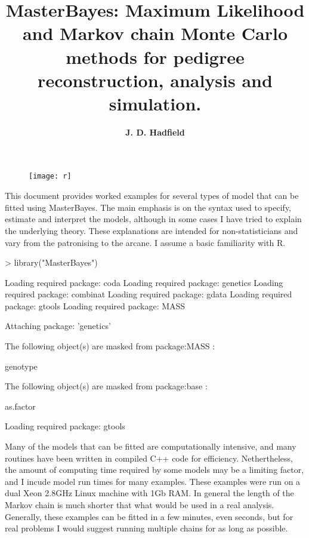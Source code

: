 \documentclass{article}
\title{\bf{\Large{MasterBayes: Maximum Likelihood and Markov chain Monte Carlo methods for pedigree reconstruction, analysis and simulation.}}}
\author{\bf{\large{J. D. Hadfield}}}
\begin{document}
\maketitle
\begin{figure}[!h]
\begin{center}
\texttt{[image: r]}
\end{center}
\end{figure}


\newpage

\tableofcontents

\newpage

This document provides worked examples for several types of model that can be fitted using MasterBayes.  The main emphasis is on the syntax used to specify, estimate and interpret the models, although in some cases I have tried to explain the underlying theory.  These explanations are intended for non-statisticians and vary from the patronising to the arcane. I assume a basic familiarity with R.

\begin{Schunk}
\begin{Sinput}
> library("MasterBayes")
\end{Sinput}
\begin{Soutput}
Loading required package: coda
Loading required package: genetics
Loading required package: combinat
Loading required package: gdata
Loading required package: gtools
Loading required package: MASS

Attaching package: 'genetics'


	The following object(s) are masked from package:MASS :

	 genotype 


	The following object(s) are masked from package:base :

	 as.factor 

Loading required package: gtools
\end{Soutput}
\end{Schunk}

Many of the models that can be fitted are computationally intensive, and many routines have been written in compiled C++ code for efficiency.  Nethertheless, the amount of computing time required by some models may be a limiting factor, and I incude model run times for many examples.  These examples were run on a dual Xeon 2.8GHz Linux machine with 1Gb RAM. In general the length of the Markov chain is much shorter that what would be used in a real analysis.  Generally, these examples can be fitted in a few minutes, even seconds, but for real problems I would suggest running multiple chains for as long as possible.  
\end{document}
